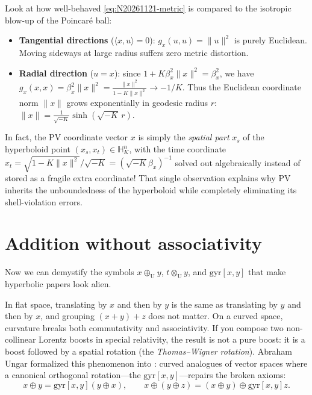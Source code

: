Look at how well-behaved \eqref{eq:N20261121-metric} is compared to the isotropic blow-up of the Poincar\'e ball:
\begin{itemize}
  \item \textbf{Tangential directions} (\(\langle x,u\rangle=0\)): \(g_x(u,u)=\|u\|^2\) is purely Euclidean. Moving sideways at large radius suffers zero metric distortion.
  \item \textbf{Radial direction} (\(u=x\)): since \(1+K\beta_x^2\|x\|^2 = \beta_x^2\), we have \(g_x(x,x) = \beta_x^2\|x\|^2 = \frac{\|x\|^2}{1-K\|x\|^2} \to -1/K\). Thus the Euclidean coordinate norm \(\|x\|\) grows exponentially in geodesic radius \(r\): \(\|x\| = \frac{1}{\sqrt{-K}}\sinh(\sqrt{-K}\,r)\).
\end{itemize}
In fact, the PV coordinate vector \(x\) is simply the \emph{spatial part} \(x_s\) of the hyperboloid point \((x_s,x_t)\in\mathbb{H}_K^n\), with the time coordinate \(x_t = \sqrt{1-K\|x\|^2}/\sqrt{-K} = (\sqrt{-K}\beta_x)^{-1}\) solved out algebraically instead of stored as a fragile extra coordinate! That single observation explains why PV inherits the unboundedness of the hyperboloid while completely eliminating its shell-violation errors.

\section{Addition without associativity}

Now we can demystify the symbols \(x\oplus_{\mathrm{U}} y\), \(t\otimes_{\mathrm{U}} y\), and \(\mathrm{gyr}[x,y]\) that make hyperbolic papers look alien.

In flat space, translating by \(x\) and then by \(y\) is the same as translating by \(y\) and then by \(x\), and grouping \((x+y)+z\) does not matter. On a curved space, curvature breaks both commutativity and associativity. If you compose two non-collinear Lorentz boosts in special relativity, the result is not a pure boost: it is a boost followed by a spatial rotation (the \emph{Thomas--Wigner rotation}). Abraham Ungar formalized this phenomenon into : curved analogues of vector spaces where a canonical orthogonal rotation---the  \(\mathrm{gyr}[x,y]\)---repairs the broken axioms:
\[
  x\oplus y = \mathrm{gyr}[x,y](y\oplus x),
  \qquad
  x\oplus(y\oplus z) = (x\oplus y)\oplus \mathrm{gyr}[x,y]z.
\]

